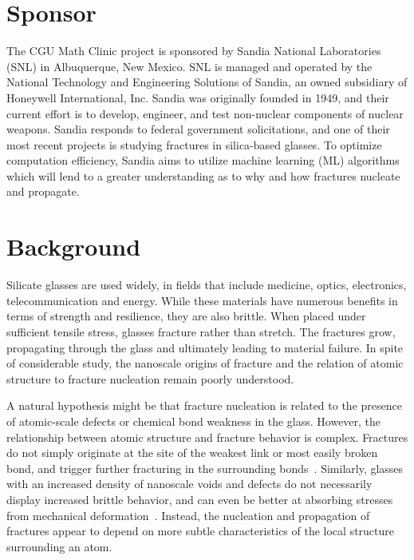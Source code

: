 \section{Sponsor}

The CGU Math Clinic project is sponsored by Sandia National Laboratories (SNL) in Albuquerque, New Mexico. SNL is managed and operated by the National Technology and Engineering Solutions of Sandia, an owned subsidiary of Honeywell International, Inc. Sandia was originally founded in 1949, and their current effort is to develop, engineer, and test non-nuclear components of nuclear weapons. Sandia responds to federal government solicitations, and one of their most recent projects is studying fractures in silica-based glasses. To optimize computation efficiency, Sandia aims to utilize machine learning (ML) algorithms which will lend to a greater understanding as to why and how fractures nucleate and propagate.


\section{Background}
Silicate glasses are used widely, in fields that include medicine, optics, electronics, telecommunication and energy. While these materials have numerous benefits in terms of strength and resilience, they are also brittle. When placed under sufficient tensile stress, glasses fracture rather than stretch. The fractures grow, propagating through the glass and ultimately leading to material failure. In spite of considerable study, the nanoscale origins of fracture and the relation of atomic structure to fracture nucleation remain poorly understood.

A natural hypothesis might be that fracture nucleation is related to the presence of atomic-scale defects or chemical bond weakness in the glass. However, the relationship between atomic structure and fracture behavior is complex. Fractures do not simply originate at the site of the weakest link or most easily broken bond, and trigger further fracturing in the surrounding bonds~\cite{markpres}. Similarly, glasses with an increased density of nanoscale voids and defects do not necessarily display increased brittle behavior, and can even be better at absorbing stresses from mechanical deformation~\cite{pedone2015dynamics}. Instead, the nucleation and propagation of fractures appear to depend on more subtle characteristics of the local structure surrounding an atom.

